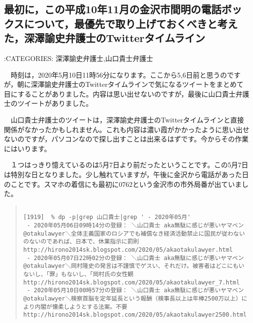 \documentclass[]{ltjarticle}
\begin{document}
\hypertarget{ux6700ux521dux306bux3053ux306eux5e73ux621010ux5e7411ux6708ux306eux91d1ux6ca2ux5e02ux9593ux660eux306eux96fbux8a71ux30dcux30c3ux30afux30b9ux306bux3064ux3044ux3066ux6700ux512aux5148ux3067ux53d6ux308aux4e0aux3052ux3066ux304aux304fux3079ux304dux3068ux8003ux3048ux305fux6df1ux6fa4ux8aedux53f2ux5f01ux8b77ux58ebux306etwitterux30bfux30a4ux30e0ux30e9ux30a4ux30f3}{%
\subsection{最初に，この平成10年11月の金沢市間明の電話ボックスについて，最優先で取り上げておくべきと考えた，深澤諭史弁護士のTwitterタイムライン}\label{ux6700ux521dux306bux3053ux306eux5e73ux621010ux5e7411ux6708ux306eux91d1ux6ca2ux5e02ux9593ux660eux306eux96fbux8a71ux30dcux30c3ux30afux30b9ux306bux3064ux3044ux3066ux6700ux512aux5148ux3067ux53d6ux308aux4e0aux3052ux3066ux304aux304fux3079ux304dux3068ux8003ux3048ux305fux6df1ux6fa4ux8aedux53f2ux5f01ux8b77ux58ebux306etwitterux30bfux30a4ux30e0ux30e9ux30a4ux30f3}}

:CATEGORIES: 深澤諭史弁護士,山口貴士弁護士

　時刻は，2020年5月10日11時56分になります。ここから5,6日前と思うのですが，朝に深澤諭史弁護士のTwitterタイムラインで気になるツイートをまとめて目にすることがありました。内容は思い出せないのですが，最後に山口貴士弁護士のツイートがありました。

　山口貴士弁護士のツイートは，深澤諭史弁護士のTwitterタイムラインと直接関係がなかったかもしれません。これも内容は濃い霞がかかったように思い出せないのですが，パソコンなので探し出すことは出来るはずです。今からその作業にはいります。

　１つはっきり憶えているのは5月7日より前だったということです。この5月7日は特別な日となりました。少し触れていますが，午後に金沢から電話があった日のことです。スマホの着信にも最初に0762という金沢市の市外局番が出ていました。

\begingroup\fontsize{9pt}{10pt}\selectfont
\begin{quote}
\begin{verbatim}

[1919]  % dp -p|grep 山口貴士|grep ' - 2020年05月'
 - 2020年05月06日09時14分の登録： ＼山口貴士 aka無駄に感じが悪いヤマベン　@otakulawyer＼全体主義国家のロシアでも補償なき経済活動禁止に国民が従わないのないのであれば、日本で、休業指示に罰則 http://hirono2014sk.blogspot.com/2020/05/akaotakulawyer.html
 - 2020年05月07日22時02分の登録： ＼山口貴士 aka無駄に感じが悪いヤマベン　@otakulawyer＼岡村隆史の発言は不謹慎でゲスい、それだけ。被害者はどこにもいないし、「罪」もないし、「岡村氏の女性観 http://hirono2014sk.blogspot.com/2020/05/akaotakulawyer_7.html
 - 2020年05月10日00時57分の登録： ＼山口貴士 aka無駄に感じが悪いヤマベン　@otakulawyer＼検察首脳を定年延長という報酬（検事長以上は年棒2500万以上）により内閣が懐柔しようとする法案。不要 http://hirono2014sk.blogspot.com/2020/05/akaotakulawyer2500.html

\end{verbatim}
\end{quote}\endgroup
\end{document}
